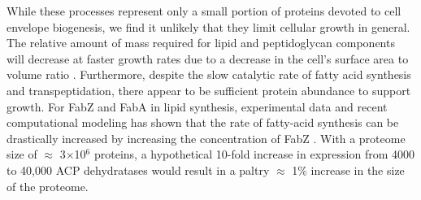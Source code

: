 

While these processes represent only a small portion of
proteins devoted to cell envelope biogenesis, we find it unlikely that they
limit cellular growth in general. The relative amount of mass required for
lipid and peptidoglycan components will decrease at faster growth rates due to a
decrease in the cell's surface area to volume ratio \citep{ojkic2019}.
Furthermore, despite the slow catalytic rate of fatty acid synthesis and transpeptidation,
there appear to be sufficient protein abundance to support growth.
For FabZ and FabA in lipid
synthesis, experimental data and recent computational modeling has shown that
the rate of fatty-acid synthesis can be drastically increased by increasing
the concentration of FabZ \citep{yu2011, ruppe2018}. With a proteome size of
$\approx$ 3$\times$10$^6$ proteins, a hypothetical 10-fold increase in
expression from 4000 to 40,000 ACP dehydratases would result in a paltry
$\approx$ 1\% increase in the size of the proteome.

